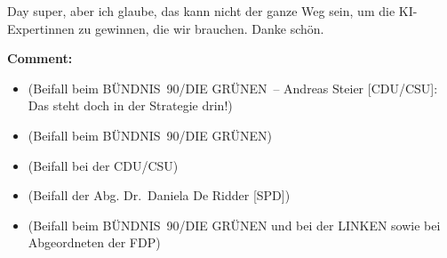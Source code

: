 \documentclass{article}
\begin{document}
Day super,  aber ich glaube, das kann nicht der ganze Weg sein, um die KI-Expertinnen zu gewinnen, die wir brauchen. Danke schön.  

\noindent\textbf{Comment:}
\begin{itemize}
    \setlength\itemsep{-3pt}
    \item (Beifall beim BÜNDNIS 90/DIE GRÜNEN – Andreas Steier [CDU/CSU]: Das steht doch in der Strategie drin!)
    \setlength\itemsep{-3pt}
    \item (Beifall beim BÜNDNIS 90/DIE GRÜNEN)
    \setlength\itemsep{-3pt}
    \item (Beifall bei der CDU/CSU)
    \setlength\itemsep{-3pt}
    \item (Beifall der Abg. Dr. Daniela De Ridder [SPD])
    \setlength\itemsep{-3pt}
    \item (Beifall beim BÜNDNIS 90/DIE GRÜNEN und bei der LINKEN sowie bei Abgeordneten der FDP)
\end{itemize}
\end{document}
